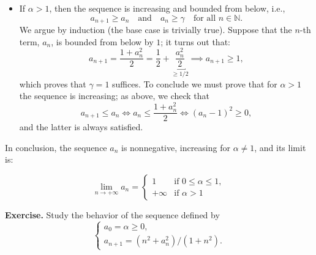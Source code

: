 \documentclass[a4paper,10 pt]{report}
\newcommand{\finalanswer}[1]{%
    \begin{finalAnswer}
    \[
        #1
    \]
    \end{finalAnswer}
}
\theoremstyle{definition}
\newcommand{\N}{\mathbb N}
\begin{document}
\begin{solutionBox}
\begin{itemize}
\item If $\alpha > 1$, then the sequence is increasing and bounded from below, i.e.,
\begin{equation*} a_{n + 1} \geq a_n \quad \text{and} \quad a_n \geq \gamma \quad \text{for all $n \in \N$}. \end{equation*}
We argue by induction (the base case is trivially true). Suppose that the $n$-th term, $a_n$, is bounded from below by $1$; it turns out that:
\begin{equation*}a_{n + 1} = \frac{1 + a_n^2}{2} = \frac{1}{2} + \underbracket{\frac{a_n^2}{2}}_{\geq 1/2} \implies a_{n + 1} \geq 1, \end{equation*}
which proves that $\gamma = 1$ suffices. To conclude we must prove that for $\alpha >1$ the sequence is increasing; as above, we check that
\begin{equation*}a_{n + 1} \leq a_n \iff a_n \leq \frac{1 + a_n^2}{2} \iff (a_n - 1)^2 \geq 0, \end{equation*}
and the latter is always satisfied.
\end{itemize}

In conclusion, the sequence $a_n$ is nonnegative, increasing for $\alpha \neq 1$, and its limit is:
\finalanswer{\lim_{n \to + \infty} a_n = \begin{cases} 1 & \text{if $0 \le \alpha \le 1$}, \\ + \infty & \text{if $\alpha >1$}\end{cases}
}
\end{solutionBox}

\begin{exerciseBox}\textbf{Exercise.} Study the behavior of the sequence defined by
\begin{equation}\label{seq.2} 
\begin{cases} a_0 = \alpha \geq 0, \\ a_{n + 1} = (n^2 + a_n^2)/(1 + n^2). \end{cases} 
\end{equation}
\end{exerciseBox}
\end{document}
